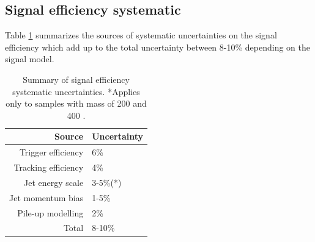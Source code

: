 \subsection{Signal efficiency systematic}

Table \ref{tab:signalsystematics} summarizes the sources of systematic uncertainties on the signal efficiency
which add up to the total uncertainty between 8-10\% depending on the signal model.

\begin{table}[htbp]
\centering
 \begin{tabular}{r|l}
  Source & Uncertainty \\
  \hline
  Trigger efficiency & 6\% \\
  Tracking efficiency & 4\% \\
  Jet energy scale & 3-5\%(*) \\
  Jet momentum bias & 1-5\% \\ 
  Pile-up modelling & 2\% \\
  \hline
 Total & 8-10\% \\
 \end{tabular}
\caption{Summary of signal efficiency systematic uncertainties. *Applies only to samples with
 \Higgs mass of 200 and 400 \GeV.
\label{tab:signalsystematics}}
\end{table} 

